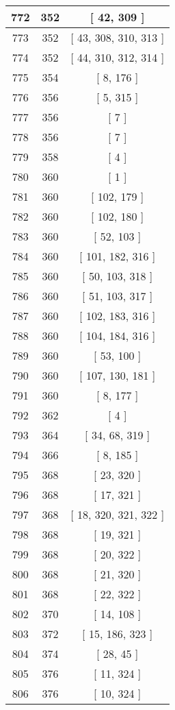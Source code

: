 \begin{center}
\begin{longtable}[H]{|| c c c ||}
\hline
772 & 352 & [ 42, 309 ] \\ 
\hline
773 & 352 & [ 43, 308, 310, 313 ] \\ 
\hline
774 & 352 & [ 44, 310, 312, 314 ] \\ 
\hline
775 & 354 & [ 8, 176 ] \\ 
\hline
776 & 356 & [ 5, 315 ] \\ 
\hline
777 & 356 & [ 7 ] \\ 
\hline
778 & 356 & [ 7 ] \\ 
\hline
779 & 358 & [ 4 ] \\ 
\hline
780 & 360 & [ 1 ] \\ 
\hline
781 & 360 & [ 102, 179 ] \\ 
\hline
782 & 360 & [ 102, 180 ] \\ 
\hline
783 & 360 & [ 52, 103 ] \\ 
\hline
784 & 360 & [ 101, 182, 316 ] \\ 
\hline
785 & 360 & [ 50, 103, 318 ] \\ 
\hline
786 & 360 & [ 51, 103, 317 ] \\ 
\hline
787 & 360 & [ 102, 183, 316 ] \\ 
\hline
788 & 360 & [ 104, 184, 316 ] \\ 
\hline
789 & 360 & [ 53, 100 ] \\ 
\hline
790 & 360 & [ 107, 130, 181 ] \\ 
\hline
791 & 360 & [ 8, 177 ] \\ 
\hline
792 & 362 & [ 4 ] \\ 
\hline
793 & 364 & [ 34, 68, 319 ] \\ 
\hline
794 & 366 & [ 8, 185 ] \\ 
\hline
795 & 368 & [ 23, 320 ] \\ 
\hline
796 & 368 & [ 17, 321 ] \\ 
\hline
797 & 368 & [ 18, 320, 321, 322 ] \\ 
\hline
798 & 368 & [ 19, 321 ] \\ 
\hline
799 & 368 & [ 20, 322 ] \\ 
\hline
800 & 368 & [ 21, 320 ] \\ 
\hline
801 & 368 & [ 22, 322 ] \\ 
\hline
802 & 370 & [ 14, 108 ] \\ 
\hline
803 & 372 & [ 15, 186, 323 ] \\ 
\hline
804 & 374 & [ 28, 45 ] \\ 
\hline
805 & 376 & [ 11, 324 ] \\ 
\hline
806 & 376 & [ 10, 324 ] \\ 

\end{longtable}
\end{center}
